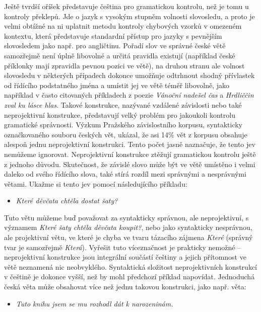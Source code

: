 \begin{multicols}{2}
Ještě tvrdší oříšek představuje čeština pro gramatickou kontrolu, než je tomu u kontroly překlepů. Jde o jazyk s vysokým stupněm volnosti slovosledu, a proto je velmi obtížné na ni uplatnit metodu kontroly chybových vzorků v omezeném kontextu, která představuje standardní přístup pro jazyky s pevnějším slovosledem jako např. pro angličtinu. Pořadí slov ve správné české větě samozřejmě není úplně libovolné a určitá pravidla existují (například české příklonky mají zpravidla pevnou pozici ve větě), na druhou stranu ale volnost slovosledu v některých případech dokonce umožňuje odtrhnout shodný přívlastek od řídícího podstatného jména a umístit jej ve větě téměř libovolně, jako například v často citovaných příkladech z poezie \textit{Vánoční nadešel čas} a \textit{Hrdliččin zval ku lásce hlas}. Takové konstrukce, nazývané vzdálené závislosti nebo také neprojektivní konstrukce, představují velký problém pro jakoukoli kontrolu gramatické správnosti. Výzkum Pražského závislostního korpusu, syntakticky označkovaného souboru českých vět, ukázal, že asi 14\% vět z korpusu obsahuje alespoň jednu neprojektivní konstrukci. Tento počet jasně naznačuje, že tento jev nemůžeme ignorovat. Neprojektivní konstrukce ztěžují gramatickou kontrolu ještě z jednoho důvodu. Skutečnost, že závislé slovo může být ve větě umístěno i velmi daleko od svého řídícího slova, také stírá rozdíl mezi správnými a nesprávnými větami. Ukažme si tento jev pomocí následujícího příkladu:

\begin{itemize}
\item[] \textit{Které děvčata chtěla dostat šaty?}
\end{itemize}

Tuto větu můžeme buď považovat za syntakticky správnou, ale neprojektivní, s významem \textit{Které šaty chtěla děvčata koupit?}, nebo jako syntakticky nesprávnou, ale projektivní větu, ve které je chyba ve tvaru tázacího zájmena \textit{Které} (správný tvar je samozřejmě \textit{Která}). Vyřešit tuto víceznačnost je prakticky nemožné – neprojektivní konstrukce jsou integrální součástí češtiny a jejich přítomnost ve větě neznamená nic neobvyklého.
Syntaktická složitost neprojektivních konstrukcí v češtině je dokonce vyšší, než by mohl předchozí příklad napovídat. Jednoduchá česká věta může obsahovat více než jednu takovou konstrukci, jako např. věta:

\begin{itemize}
\item[] \textit{Tuto knihu jsem se mu rozhodl dát k narozeninám.}
\end{itemize}


\end{multicols}
